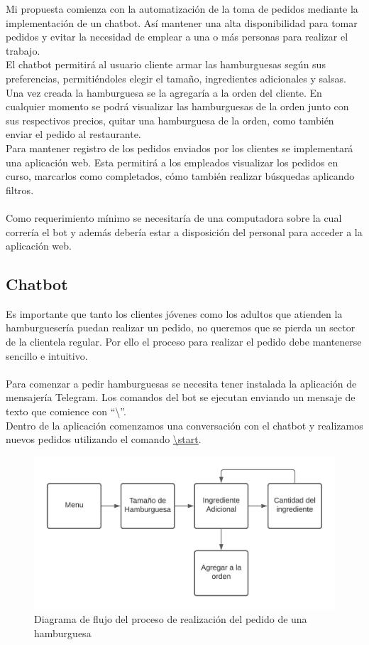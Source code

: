 \documentclass[a4paper,12pt]{article}
\begin{document}
Mi propuesta comienza con la automatización de la toma de pedidos mediante la implementación de un chatbot. Así mantener una alta disponibilidad para tomar pedidos y evitar la necesidad de emplear a una o más personas para realizar el trabajo.
\\
El chatbot permitirá al usuario cliente armar las hamburguesas según sus preferencias, permitiéndoles elegir el tamaño, ingredientes adicionales y salsas. Una vez creada la hamburguesa se la agregaría a la orden del cliente. En cualquier momento se podrá visualizar las hamburguesas de la orden junto con sus respectivos precios,  quitar una hamburguesa de la orden, como también enviar el pedido al restaurante. 
\\
Para mantener registro de los pedidos enviados por los clientes se implementará una aplicación web. Esta permitirá a los empleados visualizar los pedidos en curso, marcarlos como completados, cómo también realizar búsquedas aplicando filtros. 
\\\\
Como requerimiento mínimo se necesitaría de una computadora sobre la cual correría el bot y además debería estar a disposición del personal para acceder a la aplicación web.

\pagebreak

\subsection{Chatbot}
Es importante que tanto los clientes jóvenes como los adultos que atienden la hamburguesería puedan realizar un pedido, no queremos que se pierda un sector de la clientela regular. Por ello el proceso para realizar el pedido debe mantenerse sencillo e intuitivo.
\\\\
Para comenzar a pedir hamburguesas se necesita tener instalada la aplicación de mensajería Telegram. Los comandos del bot se ejecutan enviando un mensaje de texto que comience con “\textbackslash”.
\\
Dentro de la aplicación comenzamos una conversación con el chatbot y realizamos nuevos pedidos utilizando el comando  \color{blue}\uline{\textbackslash start}\color{black}.
\begin{figure}[H]
	\centering
	\includegraphics[width=1.0\linewidth]{diagrama-flujo.jpeg}
	 \caption{Diagrama de flujo del proceso de realización del pedido de una hamburguesa}
	\label{fig:Diagrama de Flujo}
\end{figure}
\end{document}
